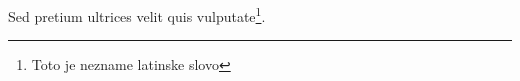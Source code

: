 \documentclass{book}
\begin{document}
Sed pretium ultrices velit quis vulputate\footnote{Toto je nezname latinske slovo}.
\end{document}
